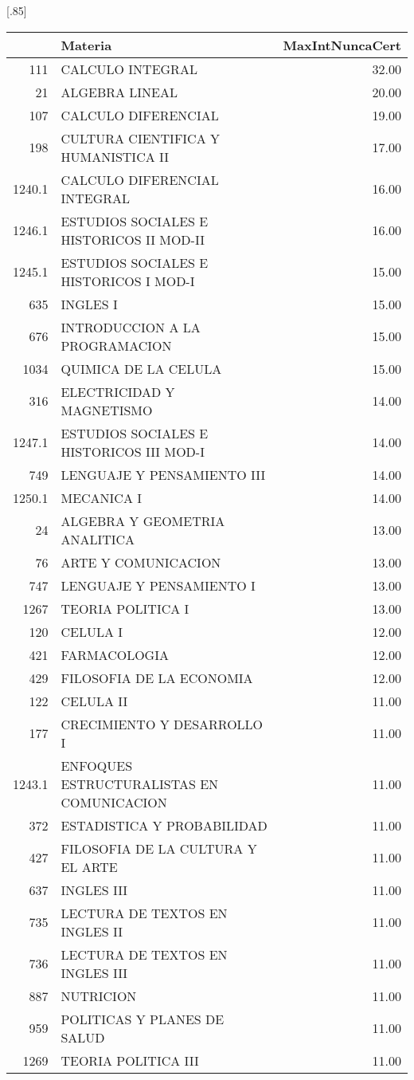\documentclass[12pt]{article}
\begin{document}
\begin{table}[ht]
\centering
\scalebox{0.75}[.85]{
\begin{tabular}{rlr}
  \hline
 & Materia & MaxIntNuncaCert \\ 
  \hline
111 & CALCULO INTEGRAL & 32.00 \\ 
  21 & ALGEBRA LINEAL & 20.00 \\ 
  107 & CALCULO DIFERENCIAL & 19.00 \\ 
  198 & CULTURA CIENTIFICA Y HUMANISTICA II & 17.00 \\ 
  1240.1 & CALCULO DIFERENCIAL INTEGRAL & 16.00 \\ 
  1246.1 & ESTUDIOS SOCIALES E HISTORICOS II MOD-II & 16.00 \\ 
  1245.1 & ESTUDIOS SOCIALES E HISTORICOS I MOD-I & 15.00 \\ 
  635 & INGLES I & 15.00 \\ 
  676 & INTRODUCCION A LA PROGRAMACION & 15.00 \\ 
  1034 & QUIMICA DE LA CELULA & 15.00 \\ 
  316 & ELECTRICIDAD Y MAGNETISMO & 14.00 \\ 
  1247.1 & ESTUDIOS SOCIALES E HISTORICOS III MOD-I & 14.00 \\ 
  749 & LENGUAJE Y PENSAMIENTO III & 14.00 \\ 
  1250.1 & MECANICA I & 14.00 \\ 
  24 & ALGEBRA Y GEOMETRIA ANALITICA & 13.00 \\ 
  76 & ARTE Y COMUNICACION & 13.00 \\ 
  747 & LENGUAJE Y PENSAMIENTO I & 13.00 \\ 
  1267 & TEORIA POLITICA I & 13.00 \\ 
  120 & CELULA I & 12.00 \\ 
  421 & FARMACOLOGIA & 12.00 \\ 
  429 & FILOSOFIA DE LA ECONOMIA & 12.00 \\ 
  122 & CELULA II & 11.00 \\ 
  177 & CRECIMIENTO Y DESARROLLO I & 11.00 \\ 
  1243.1 & ENFOQUES ESTRUCTURALISTAS EN COMUNICACION & 11.00 \\ 
  372 & ESTADISTICA Y PROBABILIDAD & 11.00 \\ 
  427 & FILOSOFIA DE LA CULTURA Y EL ARTE & 11.00 \\ 
  637 & INGLES III & 11.00 \\ 
  735 & LECTURA DE TEXTOS EN INGLES II & 11.00 \\ 
  736 & LECTURA DE TEXTOS EN INGLES III & 11.00 \\ 
  887 & NUTRICION & 11.00 \\ 
  959 & POLITICAS Y PLANES DE SALUD & 11.00 \\ 
  1269 & TEORIA POLITICA III & 11.00 \\ 
   \hline
\end{tabular}}
\end{table}
\end{document}
